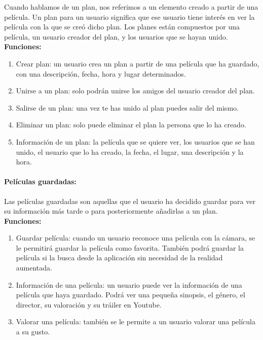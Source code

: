 Cuando hablamos de un plan, nos referimos a un elemento creado a partir de una película. Un plan para un usuario significa que ese usuario tiene interés en ver la película con la que se creó dicho plan.
Los planes están compuestos por una película, un usuario creador del plan, y los usuarios que se hayan unido.
\\
\textbf{Funciones:}
\begin{enumerate}
    \item Crear plan: un usuario crea un plan a partir de una película que ha guardado, con una descripción, fecha, hora y lugar determinados.
    \item Unirse a un plan: solo podrán unirse los amigos del usuario creador del plan.
    \item Salirse de un plan: una vez te has unido al plan puedes salir del mismo.
    \item Eliminar un plan: solo puede eliminar el plan la persona que lo ha creado.
    \item Información de un plan: la película que se quiere ver, los usuarios que se han unido, el usuario que lo ha creado, la fecha, el lugar, una descripción y la hora.
\end{enumerate} 
\paragraph{\large Películas guardadas:\\}

Las películas guardadas son aquellas que el usuario ha decidido guardar para ver su información más tarde o para posteriormente añadirlas a un plan.
\\
\textbf{Funciones:}
\begin{enumerate}
    \item Guardar película: cuando un usuario reconoce una película con la cámara, se le permitirá guardar la película como favorita. También podrá guardar la película si la busca desde la aplicación sin necesidad de la realidad aumentada.
    \item Información de una película: un usuario puede ver la información de una película que haya guardado. Podrá ver una pequeña sinopsis, el género, el director, su valoración y su tráiler en Youtube.
    \item Valorar una película: también se le permite a un usuario valorar una película a su gusto.
\end{enumerate} 
